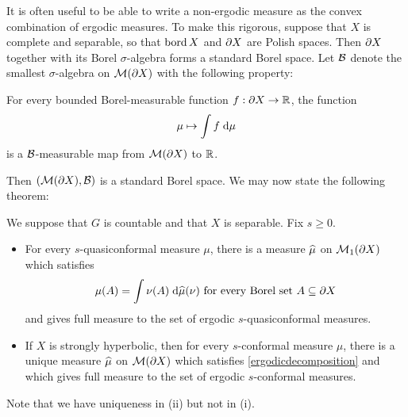It is often useful to be able to write a non-ergodic measure as the convex combination of ergodic measures. To make this rigorous, suppose that $X$ is complete and separable, so that $\operatorname{bord} X$ and $\partial X$ are Polish spaces. Then $\partial X$ together with its Borel $\sigma$-algebra forms a standard Borel space. Let $\mathcal B$ denote the smallest $\sigma$-algebra on $\mathcal M(\partial X)$ with the following property:
\begin{property}
\label{propertymeasurablestructure}
For every bounded Borel-measurable function $f:\del X\to\R$, the function
\[
\mu \mapsto \int f\;\mathrm{d}\mu
\]
is a $\mathcal B$-measurable map from $\mathcal M(\partial X)$ to $\R$.
\end{property}
Then $(\mathcal M(\partial X),\mathcal B)$ is a standard Borel space. We may now state the following theorem:

\begin{proposition}
\label{propositionergodicdecomposition}
We suppose that $G$ is countable and that $X$ is separable. 
Fix $s\geq 0$.
\begin{itemize}
\item[(i)] For every $s$-quasiconformal measure $\mu$, there is a measure $\widehat\mu$ on $\mathcal M_1(\partial X)$ which satisfies
\begin{equation}
\label{ergodicdecomposition}
\mu(A) = \int \nu(A)\;\mathrm{d}\widehat\mu(\nu) \textup{ for every Borel set $A\subseteq\partial X$}
\end{equation}
and gives full measure to the set of ergodic $s$-quasiconformal measures.
\item[(ii)] If $X$ is strongly hyperbolic, then for every $s$-conformal measure $\mu$, there is a unique measure $\widehat\mu$ on $\mathcal M(\partial X)$ which satisfies \eqref{ergodicdecomposition} and which gives full measure to the set of ergodic $s$-conformal measures.
\end{itemize}
\end{proposition}
\begin{remark}
Note that we have uniqueness in (ii) but not in (i).
\end{remark}
